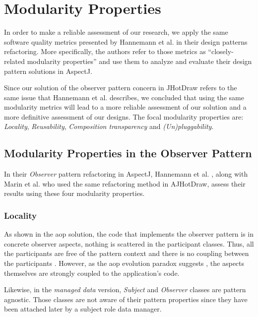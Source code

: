 \section{Modularity Properties}\label{Eval Modularity Properties}

In order to make a reliable assessment of our research, we apply the same software quality metrics presented by Hannemann et al. \cite{hannemann2002design} in their design patterns refactoring.
More specifically, the authors refer to those metrics as ``closely-related modularity properties'' and use them to analyze and evaluate their design pattern solutions in AspectJ.

Since our solution of the observer pattern concern in JHotDraw refers to the same issue that Hannemann et al. \cite{hannemann2005role} describes, we concluded that using the same modularity metrics will lead to a more reliable assessment of our solution and a more definitive assessment of our designs.
The focal modularity properties are: \textit{Locality}, \textit{Reusability}, \textit{Composition transparency} and \textit{(Un)pluggability}. 

\subsection{Modularity Properties in the Observer Pattern}

In their \textit{Observer} pattern refactoring in AspectJ, Hannemann et al. \cite{hannemann2005role}, along with Marin et al. \cite{marin2005approach} who used the same refactoring method in AJHotDraw, assess their results using these four modularity properties.

\subsubsection{Locality}
As shown in the \ac{aop} solution, the code that implements the observer pattern is in concrete observer aspects, nothing is scattered in the participant classes. 
Thus, all the participants are free of the pattern context and there is no coupling between the participants \cite{hannemann2005role}.
However, as the \ac{aop} evolution paradox suggests \cite{tourwe2003existence}, the aspects themselves are strongly coupled to the application's code.

Likewise, in the \textit{managed data} version, \textit{Subject} and \textit{Observer} classes are pattern agnostic.
Those classes are not aware of their pattern properties since they have been attached later by a subject role data manager.

